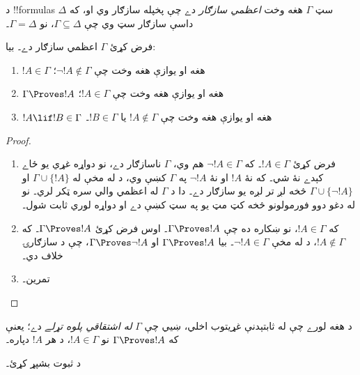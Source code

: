 \documentclass[../../../include/open-logic-section]{subfiles}
\begin{document}


\begin{defn}
د !!{formula}s سټ $\Gamma$ هغه وخت \emph{اعظمي سازګار} دے چې پخپله سازګار وي او، که $\Delta$ داسې سازګار سټ وي چې $\Gamma
\subseteq \Delta$، نو $\Gamma = \Delta$۔
\end{defn}

\begin{lem}
فرض کړئ $\Gamma$ اعظمي سازګار دے۔ بيا:
\begin{enumerate}
\item {} $!A \in \Gamma$ هغه او يوازې هغه وخت چې $\lnot !A
  \notin \Gamma$؛
\item {} $\Gamma \Proves !A$ هغه او يوازې هغه وخت چې $!A \in \Gamma$؛
\item {} $!A \lif !B \in \Gamma$ هغه او يوازې هغه وخت چې $!A \notin \Gamma$ يا $!B \in \Gamma$۔
\end{enumerate}
\end{lem}

\begin{proof}
\begin{enumerate}
\item فرض کړئ $!A \in \Gamma$۔ که $\lnot !A \in \Gamma$ هم وي، $\Gamma$ ناسازګار دے، نو دواړه غړي يو ځاے کېدے نۀ شي۔ که نۀ $!A$ او نۀ $\lnot!A$ په $\Gamma$ کښې وي، د  له مخې له $\Gamma\cup\{!A\}$ او $\Gamma \cup \{\lnot !A\}$ څخه لږ تر لږه يو سازګار دے۔ دا د $\Gamma$ له اعظمي والي سره ټکر لري۔ نو له دغو دوو فورمولونو څخه کټ مټ يو په سټ کښې دے او دواړه لوري ثابت شول۔
\item که $!A \in \Gamma$، نو ښکاره ده چې $\Gamma \Proves !A$۔ اوس فرض کړئ $\Gamma \Proves !A$۔ که $!A \notin \Gamma$، د  له مخې $\lnot !A \in \Gamma$۔ بيا $\Gamma \Proves
  !A$ او $\Gamma \Proves \lnot !A$، چې د سازګارۍ خلاف دي۔
\item تمرين۔
\end{enumerate}
\end{proof}

د  هغه لورے چې له ثابتېدنې غړيتوب اخلي، ښيي چې $\Gamma$ \emph{له اشتقاقي پلوه تړلے} دے؛ يعنې که $\Gamma \Proves !A$ نو $!A
\in \Gamma$، د هر $!A$ دپاره۔

\begin{prob}
د  ثبوت بشپړ کړئ۔
\end{prob}
\end{document}
